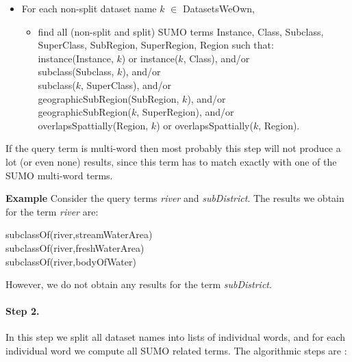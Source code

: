 \documentclass[a4paper,10pt]{article}
\begin{document}
\begin{itemize}
\item For each non-split dataset name $k$ $\in$ DatasetsWeOwn,
	\begin{itemize}
	\item find all (non-split and split) SUMO  terms  Instance, Class, Subclass, SuperClass, SubRegion, SuperRegion, Region  such that: \\
		\indent instance(Instance, $k$) or instance($k$, Class), and/or 
	\\ \indent subclass(Subclass, $k$), and/or 
		\\  \indent subclass($k$, SuperClass), and/or
			\\	\indent  geographicSubRegion(SubRegion, $k$), and/or  
			\\ \indent geographicSubRegion($k$, SuperRegion), and/or  
			\\ \indent  overlapsSpattially(Region, $k$) or 	 overlapsSpattially($k$, Region).
	
	\end{itemize}	
\end{itemize}

If the query term is multi-word then most probably this step will not produce a lot (or even none) results, since this term has to match exactly with one of the SUMO multi-word terms.

\textbf{Example} Consider the query terms \textit{river} and \textit{subDistrict}. The results we obtain for the term \textit{river} are: 

\indent subclassOf(river,streamWaterArea) \\
\indent subclassOf(river,freshWaterArea) \\
\indent subclassOf(river,bodyOfWater)

However, we do not obtain any results for the term \textit{subDistrict}.
	

\paragraph{Step 2.} In this step we split all dataset names into lists of individual words, and for each individual word we compute all SUMO related terms.
The algorithmic steps are :
\end{document}
